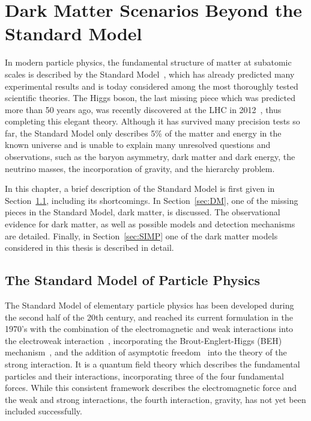 \graphicspath{{intro/}{theory/}}

\renewcommand\evenpagerightmark{{\scshape\small Chapter 2}}
\renewcommand\oddpageleftmark{{\scshape\small Dark Matter Scenarios Beyond the Standard Model}}


\hyphenation{}

\chapter{Dark Matter Scenarios Beyond the Standard Model}
\label{ch:theory}

In modern particle physics, the fundamental structure of matter at subatomic scales is described by the Standard Model~\cite{Peskin:257493, BSMWiley}, which has already predicted many experimental results and is today considered among the most thoroughly tested scientific theories. The Higgs boson, the last missing piece which was predicted more than 50 years ago, was recently discovered at the \ac{LHC} in 2012~\cite{Aad:2012tfa, Chatrchyan:2012xdj}, thus completing this elegant theory. Although it has survived many precision tests so far, the Standard Model only describes 5\% of the matter and energy in the known universe and is unable to explain many unresolved questions and observations, such as the baryon asymmetry, dark matter and dark energy, the neutrino masses, the incorporation of gravity, and the hierarchy problem.

In this chapter, a brief description of the Standard Model is first given in Section~\ref{sec:SM}, including its shortcomings. In Section~\ref{sec:DM}, one of the missing pieces in the Standard Model, dark matter, is discussed. The observational evidence for dark matter, as well as possible models and detection mechanisms are detailed. Finally, in Section~\ref{sec:SIMP} one of the dark matter models considered in this thesis is described in detail.

\section{The Standard Model of Particle Physics}
\label{sec:SM}

The Standard Model of elementary particle physics has been developed during the second half of the 20th century, and reached its current formulation in the 1970's with the combination of the electromagnetic and weak interactions into the electroweak interaction~\cite{Glashow:1959wxa, Weinberg:1967tq, Salam:1959zz}, incorporating the Brout-Englert-Higgs (BEH) mechanism~\cite{Englert:1964et,Higgs:1964pj,Guralnik:1964eu}, and the addition of asymptotic freedom~\cite{Gross:1973id, Politzer:1973fx} into the theory of the strong interaction.
It is a quantum field theory which describes the fundamental particles and their interactions, incorporating three of the four fundamental forces. While this consistent framework describes the electromagnetic force and the weak and strong interactions, the fourth interaction, gravity, has not yet been included successfully.

